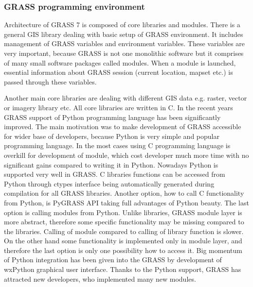 \documentclass[a4paper,12pt]{article}
\begin{document}
\subsubsection{GRASS programming  environment}




Architecture of GRASS 7 is composed of core libraries and modules. There is a general GIS library 
dealing with basic setup of GRASS environment. It includes management of
GRASS variables and environment variables. These variables are very important, because GRASS is not one monolithic software 
but it comprises of many small software packages called modules. When a module is launched, essential information 
about GRASS session (current location, mapset etc.) is passed through these variables. 

Another main core libraries are dealing with different GIS data e.g. raster, vector or imagery library etc. 
All core libraries are written in C. In the recent years GRASS support of Python programming language has been significantly 
improved. The main motivation was to make development of GRASS accessible for wider base
of developers, because Python is very simple and popular programming language. 
In the most cases using 
C programming language is overkill for development of module, which cost developer much more time 
with no significant gains compared to writing it in Python. Nowadays Python is supported very well in GRASS.
C libraries functions can be accessed from Python through ctypes interface being automatically generated during compilation
for all GRASS libraries.  
Another option, how to call C functionality from Python, is 
PyGRASS API taking full advantages of Python beauty.
The last option is calling modules from Python. Unlike libraries, GRASS module layer is more abstract, 
therefore some specific functionality may be missing compared to the libraries. Calling of module
compared to calling of library function is slower.
On the other hand some functionality is implemented
only in module layer, and therefore the last option is only one possibility how to access it.
Big momentum of Python integration has been given into the GRASS by development of wxPython graphical
user interface. 
Thanks to the Python support, GRASS has attracted new developers, who implemented many new modules.
\end{document}
